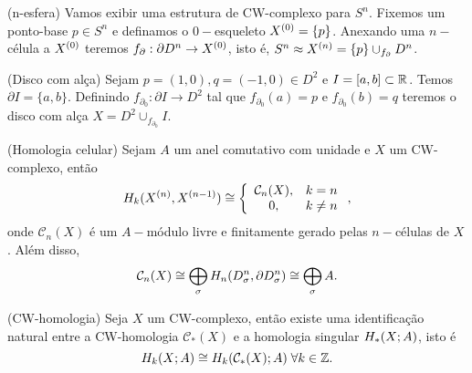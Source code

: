 \documentclass{beamer}
\begin{document}
	
	\begin{frame}
		\begin{exemplo}
			(n-esfera) Vamos exibir uma estrutura de CW-complexo para $S^{n}$. Fixemos um ponto-base $p \in S^{n}$ e definamos o $0-$esqueleto $X^{(0)}=\{p\}$. Anexando uma $n-$célula a $X^{(0)}$ teremos $f_{\partial}: \partial D^{n} \to X^{(0)}$, isto é, $S^{n} \approx X^{(n)} = \{p\}\cup_{f_{\partial}} D^{n}_{}$.
		\end{exemplo}
		
		\pause
		\begin{exemplo}
			(Disco com alça) Sejam $p=(1,0), q=(-1,0) \in D^{2}$ e $I=[a,b] \subset \mathbb{R}^{}$. Temos $\partial I=\{a,b\}$. Definindo $f_{\partial_{0}}: \partial I \to D^{2}$ tal que $f_{\partial_{0}}(a)=p$ e $f_{\partial_{0}}(b)=q$ teremos o disco com alça $X=D^{2}\cup_{f_{\partial_{0}}}I$.   
		\end{exemplo}
	\end{frame}
	
	\begin{frame}
		
		\begin{lema}
			(Homologia celular) Sejam $A$ um anel comutativo com unidade e $X$ um CW-complexo, então
			$$
			H_{k}(X^{(n)}, X^{(n-1)}) \cong 
			\left\{
			\begin{array}{cc}
			\mathcal{C}_{n}(X), & k = n\\
			0, & k\neq n\\
			\end{array}
			\right.,
			$$
			onde $\mathcal{C}_{n}(X)$ é um $A-$módulo livre e finitamente gerado pelas $n-$células de $X$. Além disso,
			$$
			\mathcal{C}_{n}(X) \cong \bigoplus \limits_{\sigma} H_{n}(D^{n}_{\sigma}, \partial D^{n}_{\sigma}) \cong \bigoplus \limits_{\sigma} A.
			$$
			
		\end{lema}
		
	\end{frame}
	
	
	\begin{frame}
		
		
		\begin{teorema}
			(CW-homologia) Seja $X$ um CW-complexo, então existe uma identificação natural entre a CW-homologia $\mathcal{C}_{*}(X)$ e a homologia singular $H_{*}(X;A)$, isto é 
			$$
			H_{k}(X;A) \cong H_{k}(\mathcal{C}_{*}(X);A)\; \forall k \in \mathbb{Z}.
			$$
		\end{teorema}
	\end{frame}
	
\end{document}
